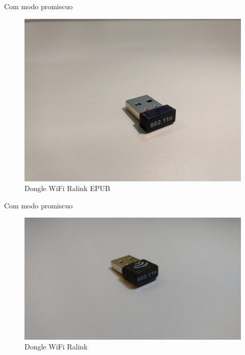 Com modo promiscuo

\begin{figure}[htb]
	\caption{\label{fig:modulos-esp}Dongle WiFi Ralink EPUB}
	\begin{center}
		\includegraphics[width=1\textwidth]{040-plataformas/RPi-WiFi-dongles/ralink-epub.jpg}
	\end{center}
\end{figure}

Com modo promiscuo

\begin{figure}[htb]
	\caption{\label{fig:modulos-esp}Dongle WiFi Ralink}
	\begin{center}
		\includegraphics[width=1\textwidth]{040-plataformas/RPi-WiFi-dongles/ralink.jpg}
	\end{center}
\end{figure}
